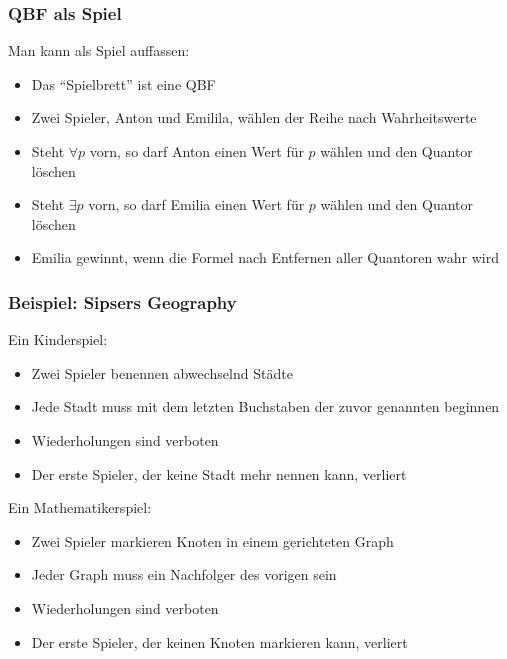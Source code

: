 \documentclass[also={handout}]{beamerswitch}
\begin{document}
\begin{frame}\frametitle{QBF als Spiel}

Man kann  als Spiel auffassen:
\begin{itemize}
\item Das "`Spielbrett"' ist eine QBF
\item Zwei Spieler, \alert{Anton} und \alert{Emilila}, wählen der Reihe nach Wahrheitswerte
\item Steht $\forall p$ vorn, so darf Anton einen Wert für $p$ wählen und den Quantor löschen
\item Steht $\exists p$ vorn, so darf Emilia einen Wert für $p$ wählen und den Quantor löschen
\item Emilia gewinnt, wenn die Formel nach Entfernen aller Quantoren wahr wird 
\end{itemize}\bigskip\pause


\end{frame}

\begin{frame}\frametitle{Beispiel: Sipsers Geography}

\alert{Ein Kinderspiel:}
\begin{itemize}
\item Zwei Spieler benennen abwechselnd Städte
\item Jede Stadt muss mit dem letzten Buchstaben der zuvor genannten beginnen
\item Wiederholungen sind verboten
\item Der erste Spieler, der keine Stadt mehr nennen kann, verliert
\end{itemize}
\smallskip

\pause
\alert{Ein Mathematikerspiel:}
\begin{itemize}
\item Zwei Spieler markieren Knoten in einem gerichteten Graph
\item Jeder Graph muss ein Nachfolger des vorigen sein
\item Wiederholungen sind verboten
\item Der erste Spieler, der keinen Knoten markieren kann, verliert
\end{itemize}
\smallskip\pause

{}

\end{frame}
\end{document}
